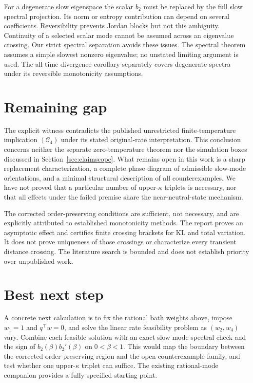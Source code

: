 \documentclass[11pt]{article}
\begin{document}
For a degenerate slow eigenspace the scalar $b_2$ must be replaced by the full slow spectral projection. Its norm or entropy contribution can depend on several coefficients. Reversibility prevents Jordan blocks but not this ambiguity. Continuity of a selected scalar mode cannot be assumed across an eigenvalue crossing. Our strict spectral separation avoids these issues. The spectral theorem assumes a simple slowest nonzero eigenvalue; no unstated limiting argument is used. The all-time divergence corollary separately covers degenerate spectra under its reversible monotonicity assumptions.

\section{Remaining gap}
The explicit witness contradicts the published unrestricted finite-temperature implication $(\mathcal C_4)$ under its stated original-rate interpretation. This conclusion concerns neither the separate zero-temperature theorem nor the simulation boxes discussed in Section~\ref{sec:claimscope}. What remains open in this work is a sharp replacement characterization, a complete phase diagram of admissible slow-mode orientations, and a minimal structural description of all counterexamples. We have not proved that a particular number of upper-$\kappa$ triplets is necessary, nor that all effects under the failed premise share the near-neutral-state mechanism.

The corrected order-preserving conditions are sufficient, not necessary, and are explicitly attributed to established monotonicity methods. The report proves an asymptotic effect and certifies finite crossing brackets for KL and total variation. It does not prove uniqueness of those crossings or characterize every transient distance crossing. The literature search is bounded and does not establish priority over unpublished work.

\section{Best next step}
A concrete next calculation is to fix the rational bath weights above, impose $w_1=1$ and $q^\top w=0$, and solve the linear rate feasibility problem as $(w_2,w_4)$ vary. Combine each feasible solution with an exact slow-mode spectral check and the sign of $b_2(\beta)b_2'(\beta)$ on $0<\beta<1$. This would map the boundary between the corrected order-preserving region and the open counterexample family, and test whether one upper-$\kappa$ triplet can suffice. The existing rational-mode companion provides a fully specified starting point.
\end{document}
